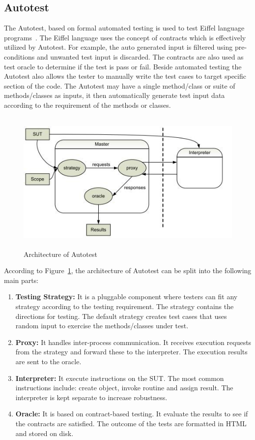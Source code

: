 \subsection{Autotest}
The Autotest, based on formal automated testing is used to test Eiffel language programs~\cite{Ciupa2007}. The Eiffel language uses the concept of contracts which is effectively utilized by Autotest. For example, the auto generated input is filtered using pre-conditions and unwanted test input is discarded. The contracts are also used as test oracle to determine if the test is pass or fail. Beside automated testing the Autotest also allows the tester to manually write the test cases to target specific section of the code. The Autotest may have a single method/class or suite of methods/classes as inputs, it then automatically generate test input data according to the requirement of the methods or classes.

\begin{figure}[h]
	\centering
	\includegraphics[width=13cm, height=7cm]{chapter3/autotest.png}
	\caption{Architecture of Autotest~\cite{Leitner2007}}
	\label{fig:autotest}
\end{figure}

\noindent According to Figure~\ref{fig:autotest}, the architecture of Autotest can be split into the following main parts:
\begin{enumerate}
\item \textbf{Testing Strategy:} It is a pluggable component where testers can fit any strategy according to the testing requirement. The strategy contains the directions for testing.%
The default strategy creates test cases that uses random input to exercise the methods/classes under test.
\item \textbf{Proxy:} It handles inter-process communication. It receives execution requests from the strategy and forward these to the interpreter. The execution results are sent to the oracle.
\item \textbf{Interpreter:} It execute instructions on the SUT. The most common instructions include: create object, invoke routine and assign result. The interpreter is kept separate to increase robustness.
\item \textbf{Oracle:} It is based on contract-based testing. It evaluate the results to see if the contracts are satisfied. The outcome of the tests are formatted in HTML and stored on disk.
\end{enumerate}


